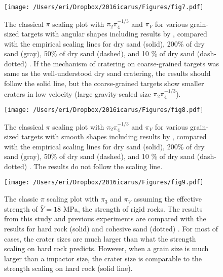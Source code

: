 \documentclass[3p,authoryear]{elsarticle}
\begin{document}
\begin{figure}[htbp]
	\begin{center}
	\texttt{[image: /Users/eri/Dropbox/2016icarus/Figures/fig7.pdf]}
	\caption{The classical $\pi$ scaling plot with $\pi_2\pi_4^{-1/3}$ and $\pi_V$ for various grain-sized targets with angular shapes including results by \citet{schmidt1980,mizutani1983,cintala1999}, compared with the empirical scaling lines for dry sand (solid), 200\% of dry sand (gray), 50\% of dry sand (dashed), and 10 \% of dry sand (dash-dotted) \citep{schmidt1987}. If the mechanism of cratering on coarse-grained targets was same as the well-understood dry sand cratering, the results should follow the solid line, but the coarse-grained targets show smaller craters in low velocity (large gravity-scaled size $\pi_2\pi_4^{-1/3}$).}
	\label{pi2-pebble}
	\end{center}
\end{figure}

\begin{figure}[htbp]
	\begin{center}
	\texttt{[image: /Users/eri/Dropbox/2016icarus/Figures/fig8.pdf]}
	\caption{The classical $\pi$ scaling plot with $\pi_2\pi_4^{-1/3}$ and $\pi_V$ for various grain-sized targets with smooth shapes including results by \citet{schmidt1980,yamamoto2006,guettler2012}, compared with the empirical scaling lines for dry sand (solid), 200\% of dry sand (gray), 50\% of dry sand (dashed), and 10 \% of dry sand (dash-dotted) \citep{schmidt1987}. The results do not follow the scaling line.}
	\label{pi2-gb}
	\end{center}
\end{figure}

\begin{figure}[htpb]
	\centering
	\texttt{[image: /Users/eri/Dropbox/2016icarus/Figures/fig9.pdf]}
	\caption{The classic $\pi$ scaling plot with $\pi_3$ and $\pi_V$ assuming the effective strength of $\bar{Y}=18$ MPa, the strength of rigid rocks. The results from this study and previous experiments \citep{schmidt1980,mizutani1983,cintala1999,yamamoto2006,guettler2012,holsapple2014} are compared with the results for hard rock (solid) and cohesive sand (dotted) \citep{schmidt1987}. For most of cases, the crater sizes are much larger than what the strength scaling on hard rock predicts. However, when a grain size is much larger than a impactor size, the crater size is comparable to the strength scaling on hard rock (solid line).}
	\label{pi3-scaling}
	\centering
\end{figure}
\end{document}
